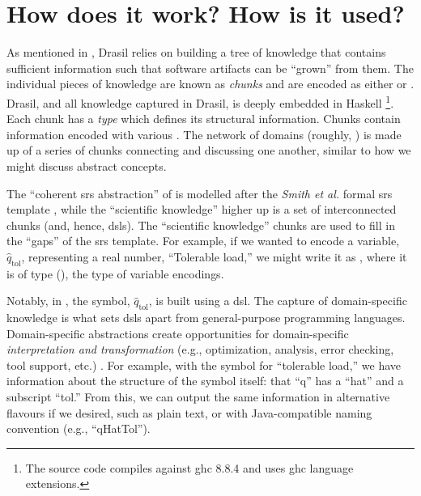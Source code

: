 \caseStudiesCodeTable{}

\section{How does it work? How is it used?}
\label{chap:drasil:sec:how-does-it-work-how-is-it-used}

As mentioned in , Drasil relies
on building a tree of knowledge that contains sufficient information such that
software artifacts can be ``grown'' from them. The individual pieces of
knowledge are known as \textit{chunks} and are encoded as either  or
. Drasil, and all knowledge captured in Drasil, is deeply embedded in
Haskell \cite{Haskell2010} \footnote{The source code
      compiles against \acs{ghc} 8.8.4 \cite{GHC884} and uses \acs{ghc} language
      extensions.}. Each chunk has a \textit{type} which defines its structural
information. Chunks contain information encoded with various . The
network of domains (roughly, ) is made up of a series
of chunks connecting and discussing one another, similar to how we might discuss
abstract concepts.

The ``coherent \acs{srs} abstraction'' of  is
modelled after the \textit{Smith et al.} formal \acs{srs} template
\cite{SmithAndLai2005}, while the ``scientific knowledge'' higher up is a set of
interconnected chunks (and, hence, \acsp{dsl}). The ``scientific knowledge''
chunks are used to fill in the ``gaps'' of the \acs{srs} template. For example,
if we wanted to encode a variable, \(\hat{q}_{\text{tol}}\), representing a real
number, ``Tolerable load,'' we might write it as
, where it is of type \QuantityDict{}
(), the type of variable encodings.

\originalQuantityDictExampleHaskell{}

\originalQuantityDictHaskell{}

Notably, in , the symbol,
\(\hat{q}_{\text{tol}}\), is built using a \Symbol{} \acs{dsl}. The capture of
domain-specific knowledge is what sets \acsp{dsl} apart from general-purpose
programming languages. Domain-specific abstractions create opportunities for
domain-specific \textit{interpretation and transformation} (e.g., optimization,
analysis, error checking, tool support, etc.) \cite{Czarnecki2005}. For example,
with the symbol for ``tolerable load,'' we have information about the structure
of the symbol itself: that ``q'' has a ``hat'' and a subscript ``tol.'' From
this, we can output the same information in alternative flavours if we desired,
such as plain text, or with Java-compatible naming convention (e.g.,
``qHatTol'').

